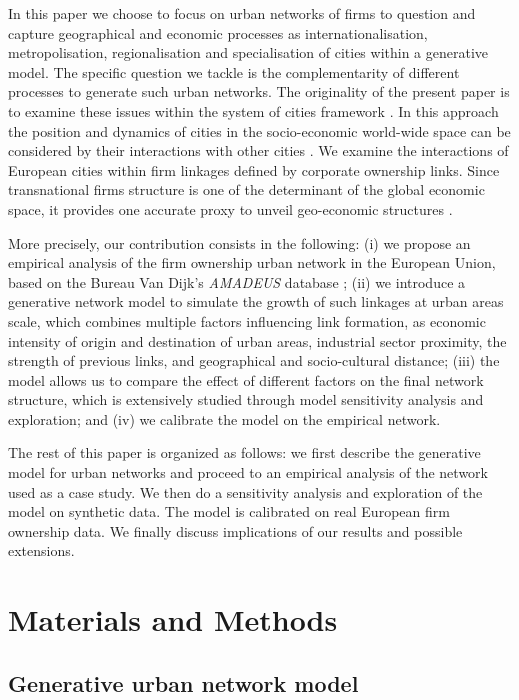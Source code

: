 \documentclass[10pt,letterpaper]{article}
\begin{document}
In this paper we choose to focus on urban networks of firms to question and capture geographical and economic processes as internationalisation, metropolisation, regionalisation and specialisation of cities within a generative model. The specific question we tackle is the complementarity of different processes to generate such urban networks. The originality of the present paper is to examine these issues within the system of cities framework \cite{berry1964cities}. In this approach the position and dynamics of cities in the socio-economic world-wide space can be considered by their interactions with other cities \cite{pumain2018evolutionary}. We examine the interactions of European cities within firm linkages defined by corporate ownership links. Since transnational firms structure is one of the determinant of the global economic space, it provides one accurate proxy to unveil geo-economic structures \cite{2019arXiv191014652Z}. 

More precisely, our contribution consists in the following: (i) we propose an empirical analysis of the firm ownership urban network in the European Union, based on the Bureau Van Dijk's \emph {AMADEUS} database \cite{AMADEUS2018}; (ii) we introduce a generative network model to simulate the growth of such linkages at urban areas scale, which combines multiple factors influencing link formation, as economic intensity of origin and destination of urban areas, industrial sector proximity, the strength of previous links, and geographical and socio-cultural distance; (iii) the model allows us to compare the effect of different factors on the final network structure, which is extensively studied through model sensitivity analysis and exploration; and (iv) we calibrate the model on the empirical network.


The rest of this paper is organized as follows: we first describe the generative model for urban networks and proceed to an empirical analysis of the network used as a case study. We then do a sensitivity analysis and exploration of the model on synthetic data. The model is calibrated on real European firm ownership data. We finally discuss implications of our results and possible extensions.

\section*{Materials and Methods}

\subsection*{Generative urban network model}
\end{document}
